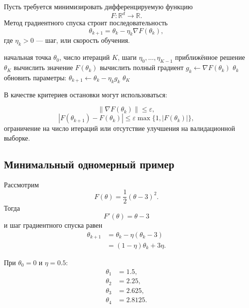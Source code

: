 \documentclass[12pt,a4paper]{article}
\theoremstyle{plain}
\theoremstyle{definition}
\theoremstyle{remark}
\newcommand{\R}{\mathbb{R}}
\newcommand{\norm}[1]{\left\lVert #1 \right\rVert}
\newcommand{\abs}[1]{\left| #1 \right|}
\begin{document}
Пусть требуется минимизировать дифференцируемую функцию
\[
    F\colon\R^d\to\R.
\]
Метод градиентного спуска строит последовательность
\[
    \theta_{k+1}
    =
    \theta_k
    -
    \eta_k\nabla F(\theta_k),
\]
где $\eta_k>0$ --- шаг, или скорость обучения.

\begin{algorithm}[H]
\caption{Полный градиентный спуск}
\begin{algorithmic}[1]
\Require начальная точка $\theta_0$, число итераций $K$,
шаги $\eta_0,\ldots,\eta_{K-1}$
\Ensure приближённое решение $\theta_K$
    \State вычислить значение $F(\theta_k)$
    \State вычислить полный градиент
    $g_k\gets\nabla F(\theta_k)$
        \State \Return $\theta_k$
    \EndIf
    \State обновить параметры:
    $\theta_{k+1}\gets\theta_k-\eta_k g_k$
\EndFor
\State \Return $\theta_K$
\end{algorithmic}
\end{algorithm}

В качестве критериев остановки могут использоваться:

\[
    \norm{\nabla F(\theta_k)}\leq\varepsilon,
\]
\[
    \abs{F(\theta_{k+1})-F(\theta_k)}
    \leq
    \varepsilon\max\{1,\abs{F(\theta_k)}\},
\]
ограничение на число итераций или отсутствие улучшения на
валидационной выборке.

\subsection{Минимальный одномерный пример}

Рассмотрим
\[
    F(\theta)
    =
    \frac{1}{2}(\theta-3)^2.
\]
Тогда
\[
    F'(\theta)=\theta-3
\]
и шаг градиентного спуска равен
\[
\begin{aligned}
    \theta_{k+1}
    &=
    \theta_k-\eta(\theta_k-3)\\
    &=
    (1-\eta)\theta_k+3\eta.
\end{aligned}
\]

При $\theta_0=0$ и $\eta=0.5$:
\[
\begin{aligned}
    \theta_1&=1.5,\\
    \theta_2&=2.25,\\
    \theta_3&=2.625,\\
    \theta_4&=2.8125.
\end{aligned}
\]

\begin{center}
\end{center}
\end{document}
